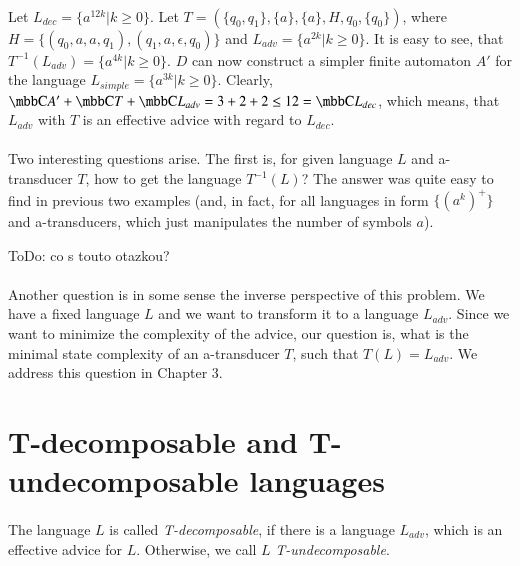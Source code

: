 \paragraph{}
\cpriklad Let $L_{dec} = \{ a^{12k}| k \geq 0 \} $. Let $T= (\{q_0, q_1\}, \{a\}, \{a\}, H, q_0, \{q_0\})$, where $H = \{(q_0, a, a, q_1), (q_1, a, \epsilon, q_0)\}$ and $L_{adv} = \{ a^{2k}| k \geq 0 \}$. It is easy to see, that $T^{-1}(L_{adv}) = \{ a^{4k}| k \geq 0 \}$. $D$ can now construct a simpler finite automaton $A'$ for the language $L_{simple} = \{ a^{3k}| k \geq 0 \}$. Clearly, $\C{A'} + \C{T} + \C{L_{adv}} = 3 + 2 + 2 \leq 12 = \C{L_{dec}}$, which means, that $L_{adv}$ with $T$ is an effective advice with regard  to $L_{dec}$.

\paragraph{}
Two interesting questions arise. The first is, for given language $L$ and a-transducer $T$, how to get the language $T^{-1}(L)$? The answer was quite easy to find in previous two examples (and, in fact, for all languages in form $\{ (a^k)^+ \}$ and a-transducers, which just manipulates the number of symbols $a$).

\color{red}ToDo: co s touto otazkou?\color{black}

\paragraph{}
Another question is in some sense the inverse perspective of this problem. We have a fixed language $L$ and we want to transform it to a language $L_{adv}$. Since we want to minimize the complexity of the advice, our question is, what is the minimal state complexity of an a-transducer $T$, such that $T(L) = L_{adv}$. We address this question in Chapter 3.

\section{T-decomposable and T-undecomposable languages}

\paragraph{}
\cdefinicia The language $L$ is called \emph{T-decomposable}, if there is a language $L_{adv}$, which is an effective advice for $L$. Otherwise, we call $L$ \emph{T-undecomposable}.

